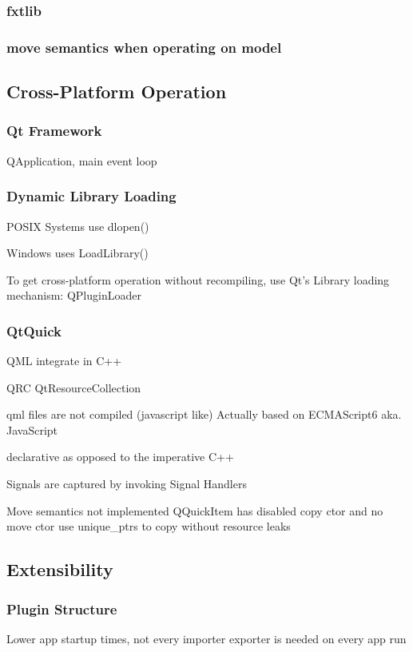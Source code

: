 \subsubsection{fxtlib}
\subsubsection{move semantics when operating on model}

\subsection{Cross-Platform Operation}
\subsubsection{Qt Framework}
QApplication, main event loop

\subsubsection{Dynamic Library Loading}
POSIX Systems use dlopen()

Windows uses LoadLibrary()

To get cross-platform operation without recompiling, use Qt's Library loading mechanism: QPluginLoader

\subsubsection{QtQuick}
QML integrate in C++

QRC QtResourceCollection

qml files are not compiled (javascript like)
Actually based on ECMAScript6 aka. JavaScript

declarative as opposed to the imperative  C++

Signals are captured by invoking Signal Handlers

Move semantics not implemented
QQuickItem has disabled copy ctor and no move ctor
use unique_ptrs to copy without resource leaks


\subsection{Extensibility}
\subsubsection{Plugin Structure}
Lower app startup times, not every importer exporter is needed on every app run

